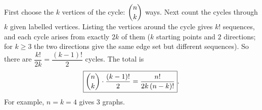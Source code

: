 First choose the $k$ vertices of the cycle: $\dbinom nk$ ways. Next count the cycles through $k$ given labelled vertices. Listing the vertices around the cycle gives $k!$ sequences, and each cycle arises from exactly $2k$ of them ($k$ starting points and $2$ directions; for $k\ge3$ the two directions give the same edge set but different sequences). So there are $\dfrac{k!}{2k}=\dfrac{(k-1)!}{2}$ cycles. The total is
\[\boxed{\dbinom nk\cdot\dfrac{(k-1)!}{2}=\dfrac{n!}{2k\,(n-k)!}}.\]
For example, $n=k=4$ gives $3$ graphs.
